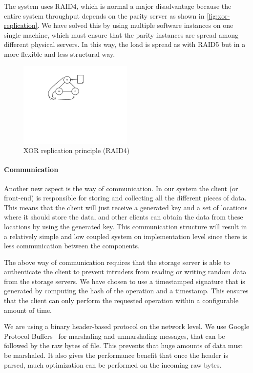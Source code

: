 \documentclass[12pt,a4paper]{scrartcl}
\begin{document}
The system uses RAID4, which is normal a major disadvantage because the entire system throughput depends on the parity server as shown in \autoref{fig:xor-replication}. We have solved this by using multiple software instances on one single machine, which must ensure that the parity instances are spread among different physical servers. In this way, the load is spread as with RAID5 but in a more flexible and less structural way.

\begin{figure}[H]
\centering
\includegraphics[width=0.5\textwidth,trim=4cm 8cm 8cm 1cm,clip=true]{diagrams/xor-replication.pdf}
\caption{XOR replication principle (RAID4)}
\label{fig:xor-replication}
\end{figure}

\paragraph{Communication}
Another new aspect is the way of communication. In our system the client (or front-end) is responsible for storing and collecting all the different pieces of data. This means that the client will just receive a generated key and a set of locations where it should store the data, and other clients can obtain the data from these locations by using the generated key. This communication structure will result in a relatively simple and low coupled system on implementation level since there is less communication between the components.

The above way of communication requires that the storage server is able to authenticate the client to prevent intruders from reading or writing random data from the storage servers. We have chosen to use a timestamped signature that is generated by computing the hash of the operation and a timestamp. This ensures that the client can only perform the requested operation within a configurable amount of time.

We are using a binary header-based protocol on the network level. We use Google Protocol Buffers~\cite{gpb}\cite{gpb-docs} for marshaling and unmarshaling messages, that can be followed by the raw bytes of file. This prevents that huge amounts of data must be marshaled. It also gives the performance benefit that once the header is parsed, much optimization can be performed on the incoming raw bytes.
\end{document}
